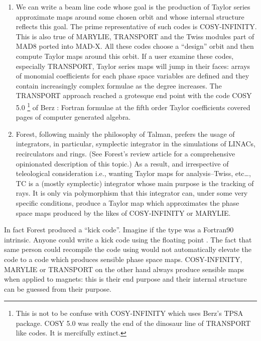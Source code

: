 \documentclass{hitec}     %
\begin{document}
 \begin{enumerate}
 \item We can write a beam line code whose goal is the production of Taylor series approximate maps around some chosen orbit and whose internal structure reflects this goal. 
 The prime representative of such codes is COSY-INFINITY\cite{cosy9,cosynim}. This is also true of MARYLIE,  TRANSPORT\cite{slac75} and the Twiss modules part of MAD8 ported into  MAD-X. All these codes choose a ``design'' orbit and then compute Taylor maps around this orbit. If a user examine these codes, especially  TRANSPORT, Taylor series maps will jump in their faces: arrays of monomial coefficients for each phase space variables are defined and they contain increasingly complex  formulae as the degree increases. The TRANSPORT approach reached a grotesque end point with the code COSY 5.0
 \footnote{This is not to be confuse with COSY-INFINITY which uses Berz's TPSA package. COSY 5.0\cite{cosy5ham} was really the end of the dinosaur line of TRANSPORT like codes. It is mercifully extinct.}
% 
 of Berz : Fortran formulae at the fifth order Taylor coefficients covered pages of computer generated algebra.
 \item
 Forest, following mainly the philosophy of Talman, prefers the usage of integrators, in particular, symplectic integrator in the simulations of LINACs, recirculators and rings. (See Forest's review article \cite{forestreview} for a comprehensive opinionated description of this topic.)  As a result, and irrespective of teleological consideration i.e., wanting Taylor maps for analysis--Twiss, etc\ldots, TC  is a (mostly symplectic) integrator whose main purpose is the tracking of rays. It is only via polymorphism that this integrator can, under some very specific conditions, produce a Taylor map which approximates the phase space maps produced by the likes of COSY-INFINITY or MARYLIE.
  \end{enumerate}
  
 In fact Forest produced a ``kick code''. Imagine if the type  was a Fortran90 intrinsic. Anyone could write a kick code using the floating point . The fact that same person could recompile the code using  would not automatically elevate the code to a code which produces sensible phase space maps. COSY-INFINITY, MARYLIE or TRANSPORT on the other hand always produce sensible maps when applied to magnets: this is their end purpose and their internal structure can be guessed from their purpose.
\end{document}

